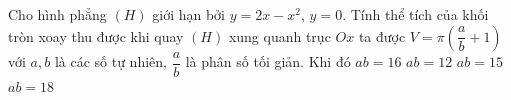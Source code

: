 \begin{ex}%
	Cho hình phẳng $(H)$ giới hạn bởi $y=2x-x^2$, $y=0$. Tính thể tích của khối tròn xoay thu  được khi quay $(H)$ xung quanh trục $Ox$ ta được $V=\pi \left(\dfrac{a}{b}+1\right)$ với $a,b$ là các số tự nhiên, $\dfrac{a}{b}$ là phân số tối giản. Khi đó
	\choice 
		 {$ab=16$}
		{$ab=12$} 
		 {\True $ab=15$}
		{$ab=18$} 
\end{ex}



